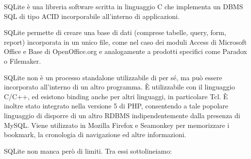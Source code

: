 \documentclass[10pt,a4paper,onecolumn]{article}
\begin{document}
SQLite è una libreria software scritta in linguaggio C che implementa un DBMS SQL di tipo ACID incorporabile all'interno di applicazioni.

SQLite permette di creare una base di dati (comprese tabelle, query, form, report) incorporata in un unico file, come nel caso dei moduli Access di Microsoft Office e Base di OpenOffice.org e analogamente a prodotti specifici come Paradox o Filemaker.

SQLite non è un processo standalone utilizzabile di per sé, ma può essere incorporato all'interno di un altro programma. È utilizzabile con il linguaggio C/C++, ed esistono binding anche per altri linguaggi, in particolare Tcl. È inoltre stato integrato nella versione 5 di PHP, consentendo a tale popolare linguaggio di disporre di un altro RDBMS indipendentemente dalla presenza di MySQL. Viene utilizzato in Mozilla Firefox e Seamonkey per memorizzare i bookmark, la cronologia di navigazione ed altre informazioni.

SQLite non manca però di limiti. Tra essi sottolineiamo:
\end{document}
